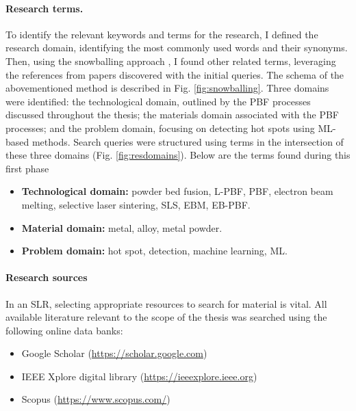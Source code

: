 \paragraph{Research terms.}
To identify the relevant keywords and terms for the research, I defined the research domain, identifying the most commonly used words and their synonyms. Then, using the snowballing approach \cite{wohlin_guidelines_2014}, I found other related terms, leveraging the references from papers discovered with the initial queries. The schema of the abovementioned method is described in Fig. \ref{fig:snowballing}. Three domains were identified: the technological domain, outlined by the PBF processes discussed throughout the thesis; the materials domain associated with the PBF processes; and the problem domain, focusing on detecting hot spots using ML-based methods. Search queries were structured using terms in the intersection of these three domains (Fig. \ref{fig:resdomains}). Below are the terms found during this first phase
\begin{itemize}
    \item \textbf{Technological domain:} powder bed fusion, L-PBF, PBF, electron beam melting, selective laser sintering, SLS, EBM, EB-PBF.
    \item \textbf{Material domain:} metal, alloy, metal powder.
    \item \textbf{Problem domain:} hot spot, detection, machine learning, ML.
\end{itemize}

\paragraph{Research sources} In an SLR, selecting appropriate resources to search for material is vital. All available literature relevant to the scope of the thesis was searched using the following online data banks:
\begin{itemize}
    \item Google Scholar (\href{https://scholar.google.com}{https://scholar.google.com})
    \item IEEE Xplore digital library (\href{https://ieeexplore.ieee.org}{https://ieeexplore.ieee.org})
    \item Scopus (\href{https://www.scopus.com/}{https://www.scopus.com/})
\end{itemize}

